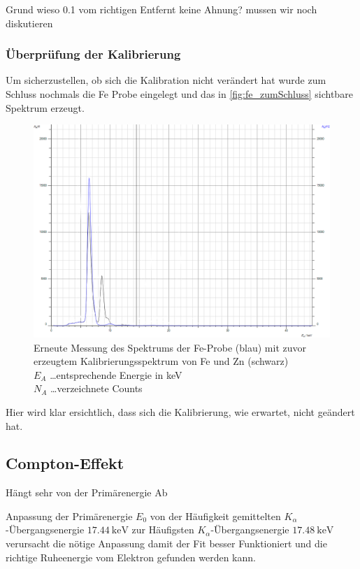 \documentclass[12pt,english,ngerman]{scrartcl}
\begin{document}
Grund wieso 0.1 vom richtigen Entfernt keine Ahnung? mussen wir noch
diskutieren

\subsubsection{Überprüfung der Kalibrierung}

Um sicherzustellen, ob sich die Kalibration nicht verändert hat wurde zum
Schluss nochmals die Fe Probe eingelegt und das in \autoref{fig:fe_zumSchluss}
sichtbare Spektrum erzeugt.

\begin{figure}[H]
	\centering
	\includegraphics[width =\textwidth]{./figures/roentgen/KalibrieungErhaltenFe.png}
	\caption[Erneute Messung des Spektrums der Fe-Probe] {Erneute Messung des Spektrums der
		Fe-Probe (blau) mit zuvor erzeugtem Kalibrierungsspektrum von Fe und Zn
		(schwarz)                                \\
		$E_A$ \dots entsprechende Energie in keV \\
		$N_A$ \dots verzeichnete Counts
	}\label{fig:fe_zumSchluss}
\end{figure}

Hier wird klar ersichtlich, dass sich die Kalibrierung, wie erwartet, nicht
geändert hat.

\subsection{Compton-Effekt}

Hängt sehr von der Primärenergie Ab

Anpassung der Primärenergie $E_0$ von der Häufigkeit gemittelten
$K_\alpha$-Übergangsenergie $\SI{17.44}{\kilo\eV}$ zur Häufigsten
$K_\alpha$-Übergangsenergie $\SI{17.48}{\kilo\eV}$ verursacht die nötige
Anpassung damit der Fit besser Funktioniert und die richtige Ruheenergie vom
Elektron gefunden werden kann.
\end{document}
